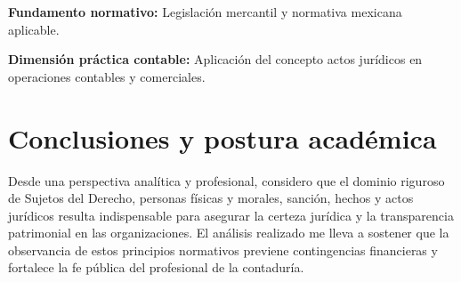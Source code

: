 {\textbf{Fundamento normativo:} Legislación mercantil y normativa mexicana aplicable.

\textbf{Dimensión práctica contable:} Aplicación del concepto actos jurídicos en operaciones contables y comerciales.


\section{Conclusiones y postura académica}
Desde una perspectiva analítica y profesional, considero que el dominio riguroso de Sujetos del Derecho, personas físicas y morales, sanción, hechos y actos jurídicos resulta indispensable para asegurar la certeza jurídica y la transparencia patrimonial en las organizaciones. El análisis realizado me lleva a sostener que la observancia de estos principios normativos previene contingencias financieras y fortalece la fe pública del profesional de la contaduría.
}


